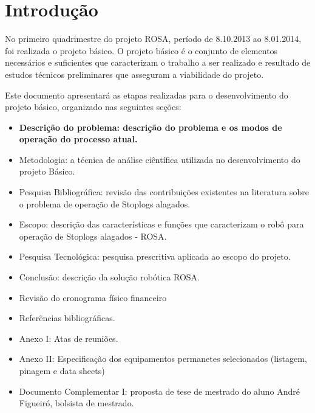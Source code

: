 


\section{Introdução}
No primeiro quadrimestre do projeto ROSA, período de 8.10.2013 ao 8.01.2014, foi realizada o projeto básico. O projeto básico é o conjunto de elementos necessários e suficientes que caracterizam o trabalho a ser realizado e resultado de estudos técnicos preliminares que asseguram a viabilidade do projeto. 

Este documento apresentará as etapas realizadas para o desenvolvimento do projeto básico, organizado nas seguintes seções:
    \begin{itemize}
        \item \bf Descrição do problema: descrição do problema e os modos de operação do processo atual.
	\item Metodologia: a técnica de análise ciêntífica utilizada no desenvolvimento do projeto Básico.
        \item Pesquisa Bibliográfica: revisão das contribuições existentes na literatura sobre o problema de operação de Stoplogs alagados.  
	\item Escopo: descrição das características e funções que caracterizam o robô para operação de Stoplogs alagados - ROSA. 
        \item Pesquisa Tecnológica: pesquisa prescritiva aplicada ao escopo do projeto. 
        \item Conclusão: descrição da solução robótica ROSA. 
         \item Revisão do cronograma físico financeiro 
        \item Referências bibliográficas.
        \item Anexo I: Atas de reuniões. 
        \item Anexo II: Especificação dos equipamentos permanetes selecionados (listagem, pinagem e data sheets) 
        \item Documento Complementar I: proposta de tese de mestrado do aluno André Figueiró, bolsista de mestrado. 

    \end{itemize}